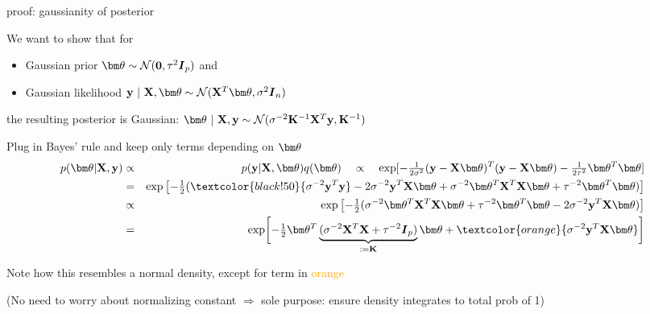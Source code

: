 \documentclass[11pt,compress,t,notes=noshow, xcolor=table]{beamer}
\begin{document}
\begin{framei}[fs=small]{proof: gaussianity of posterior}
\item We want to show that for
\begin{itemize} \small
  \item Gaussian prior $\thetav \sim \normal(\zero, \tau^2 \id_p)$ and 
  \item Gaussian likelihood $\yv ~|~ \Xmat, \thetav \sim \normal(\Xmat^T \thetav, \sigma^2 \id_n)$ 
\end{itemize}
the resulting posterior is Gaussian: $\thetav ~|~ \Xmat, \yv \sim \normal(\sigma^{-2}\Kinv\Xmat^T\yv, \Kinv)$ 
\vfill
\item Plug in Bayes' rule and keep only terms depending on $\thetav$
\begin{eqnarray*}
p(\thetav | \Xmat, \yv) &\propto& p(\yv | \Xmat, \thetav) q(\thetav) \quad \propto \quad \exp [-\tfrac{1}{2\sigma^2}(\yv - \Xmat\thetav)^T(\yv - \Xmat\thetav)-\tfrac{1}{2\tau^2}\thetav^T\thetav ] \\
&=& \exp \left[ -\tfrac{1}{2} (\textcolor{black!50}{\sigma^{-2}\yv^T\yv} - 2 \sigma^{-2} \yv^T \Xmat \thetav + \sigma^{-2}\thetav^T \Xmat^T \Xmat \thetav  + \tau^{-2} \thetav^T\thetav ) \right] \\
&\propto& \exp \left[ -\tfrac{1}{2} (\sigma^{-2}\thetav^T \Xmat^T \Xmat \thetav  + \tau^{-2} \thetav^T\thetav  - 2 \sigma^{-2} \yv^T \Xmat \thetav ) \right] \\
&=& \exp \biggl[ -\tfrac{1}{2}\thetav^T\underbrace{(\sigma^{-2} \Xmat^T \Xmat + \tau^{-2} \id_p )}_{:= \Kmat} \thetav  +\textcolor{orange}{\sigma^{-2} \yv^T \Xmat \thetav} \biggr] 
\end{eqnarray*}
\item Note how this resembles a normal density, except for term in \textcolor{orange}{orange}
\item (No need to worry about normalizing constant $\Rightarrow$ sole purpose: ensure density integrates to total prob of 1)
\end{framei}
\end{document}
